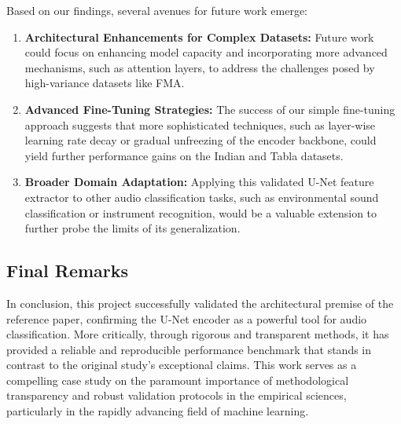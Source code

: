 \documentclass[11pt,a4paper]{article}
\begin{document}
Based on our findings, several avenues for future work emerge:
\begin{enumerate}
    \item \textbf{Architectural Enhancements for Complex Datasets:} Future work could focus on enhancing model capacity and incorporating more advanced mechanisms, such as attention layers, to address the challenges posed by high-variance datasets like FMA.
    \item \textbf{Advanced Fine-Tuning Strategies:} The success of our simple fine-tuning approach suggests that more sophisticated techniques, such as layer-wise learning rate decay or gradual unfreezing of the encoder backbone, could yield further performance gains on the Indian and Tabla datasets.
    \item \textbf{Broader Domain Adaptation:} Applying this validated U-Net feature extractor to other audio classification tasks, such as environmental sound classification or instrument recognition, would be a valuable extension to further probe the limits of its generalization.
\end{enumerate}

\subsection{Final Remarks}
In conclusion, this project successfully validated the architectural premise of the reference paper, confirming the U-Net encoder as a powerful tool for audio classification. More critically, through rigorous and transparent methods, it has provided a reliable and reproducible performance benchmark that stands in contrast to the original study's exceptional claims. This work serves as a compelling case study on the paramount importance of methodological transparency and robust validation protocols in the empirical sciences, particularly in the rapidly advancing field of machine learning.

\newpage
\listoffigures
\listoftables




\newpage



\end{document}
